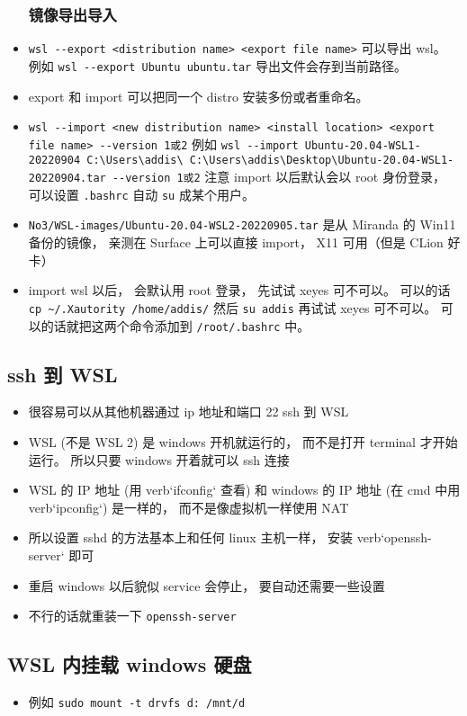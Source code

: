 \begin{itemize}
\subsubsection{镜像导出导入}
\item \verb`wsl --export <distribution name> <export file name>` 可以导出 wsl。 例如 \verb`wsl --export Ubuntu ubuntu.tar` 导出文件会存到当前路径。
\item export 和 import 可以把同一个 distro 安装多份或者重命名。
\item \verb`wsl --import <new distribution name> <install location> <export file name> --version 1或2` 例如 \verb`wsl --import Ubuntu-20.04-WSL1-20220904 C:\Users\addis\ C:\Users\addis\Desktop\Ubuntu-20.04-WSL1-20220904.tar --version 1或2` 注意 import 以后默认会以 root 身份登录， 可以设置 \verb`.bashrc` 自动 \verb`su` 成某个用户。
\item \verb`No3/WSL-images/Ubuntu-20.04-WSL2-20220905.tar` 是从 Miranda 的 Win11 备份的镜像， 亲测在 Surface 上可以直接 import， X11 可用（但是 CLion 好卡）
\item import wsl 以后， 会默认用 root 登录， 先试试 xeyes 可不可以。 可以的话 \verb`cp ~/.Xautority /home/addis/` 然后 \verb`su addis` 再试试 xeyes 可不可以。 可以的话就把这两个命令添加到 \verb`/root/.bashrc` 中。
\end{itemize}

\subsection{ssh 到 WSL}
\begin{itemize}
\item 很容易可以从其他机器通过 ip 地址和端口 22 ssh 到 WSL
\item WSL (不是 WSL 2) 是 windows 开机就运行的， 而不是打开 terminal 才开始运行。 所以只要 windows 开着就可以 ssh 连接
\item WSL 的 IP 地址 (用 verb`ifconfig` 查看) 和 windows 的 IP 地址 (在 cmd 中用 verb`ipconfig`) 是一样的， 而不是像虚拟机一样使用 NAT
\item 所以设置 sshd 的方法基本上和任何 linux 主机一样， 安装 verb`openssh-server` 即可
\item 重启 windows 以后貌似 service 会停止， 要自动还需要一些设置
\item 不行的话就重装一下 \verb|openssh-server|
\end{itemize}

\subsection{WSL 内挂载 windows 硬盘}
\begin{itemize}
\item 例如 \verb`sudo mount -t drvfs d: /mnt/d`
\end{itemize}

